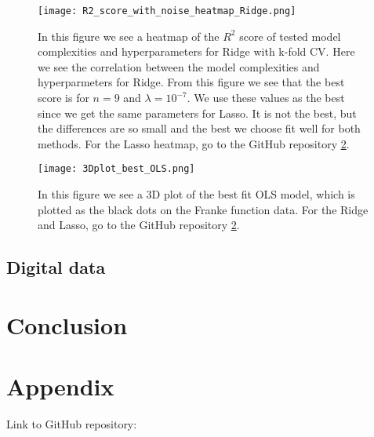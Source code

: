 \documentclass[12pt,a4paper,english]{article}
\begin{document}
\begin{figure}[htbp]
	\centering\texttt{[image: R2\_score\_with\_noise\_heatmap\_Ridge.png]}
	\caption{In this figure we see a heatmap of the $R^2$ score of tested model complexities and hyperparameters for Ridge with k-fold CV. Here we see the correlation between the model complexities and hyperparmeters for Ridge. From this figure we see that the best score is for $n=9$ and $\lambda=10^{-7}$. We use these values as the best since we get the same parameters for Lasso. It is not the best, but the differences are so small and the best we choose fit well for both methods. For the Lasso heatmap, go to the GitHub repository \ref{sect:appendix}. \label{fig:heatmap_ridge}}
\end{figure}

\begin{figure}[htbp]
	\centering\texttt{[image: 3Dplot\_best\_OLS.png]}
	\caption{In this figure we see a 3D plot of the best fit OLS model, which is plotted as the black dots on the Franke function data. For the Ridge and Lasso, go to the GitHub repository \ref{sect:appendix}. \label{fig:best_3d_OLS}}
\end{figure}

\subsection{Digital data}



\section{Conclusion}

\appendix
\section{Appendix}
\label{sect:appendix}
Link to GitHub repository:\\
\end{document}
